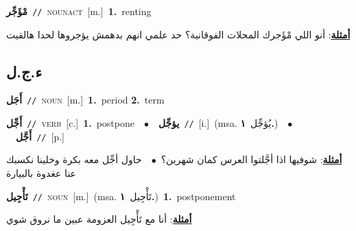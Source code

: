 \documentclass[10pt,a4paper,twoside]{article} %
\begin{document}
\begin{multicols}{2}
{{{{{\setlength\topsep{0pt}\textbf{\foreignlanguage{arabic}{مْؤَجِّر}}\ {\color{gray}\texttt{//}\color{black}}\ \textsc{noun\textunderscore act}\ [m.]\ \textbf{1.}~renting\  \begin{flushright}\color{gray}\foreignlanguage{arabic}{\textbf{\underline{\foreignlanguage{arabic}{أمثلة}}}: أنو اللي مْؤَجرك المحلات الفوقانية؟ حد علمي انهم بدهمش يؤجروها لحدا هالقيت}\end{flushright}\color{black}} \vspace{2mm}

\vspace{-3mm}
\subsection*{\color{blue}\foreignlanguage{arabic}{ء.ج.ل}\color{blue}{}} 

{\setlength\topsep{0pt}\textbf{\foreignlanguage{arabic}{أَجَل}}\ {\color{gray}\texttt{//}\color{black}}\ \textsc{noun}\ [m.]\ \textbf{1.}~period  \textbf{2.}~term\ 

{\setlength\topsep{0pt}\textbf{\foreignlanguage{arabic}{أَجِّل}}\ {\color{gray}\texttt{//}\color{black}}\ \textsc{verb}\ [c.]\ \textbf{1.}~postpone\ \ $\bullet$\ \ \setlength\topsep{0pt}\textbf{\foreignlanguage{arabic}{يؤجِّل}}\ {\color{gray}\texttt{//}\color{black}}\ [i.]\ \color{gray}(msa. \foreignlanguage{arabic}{يُؤجِّل}~\foreignlanguage{arabic}{\textbf{١.}})\color{black}\ \ $\bullet$\ \ \setlength\topsep{0pt}\textbf{\foreignlanguage{arabic}{أَجَّل}}\ {\color{gray}\texttt{//}\color{black}}\ [p.]\  \begin{flushright}\color{gray}\foreignlanguage{arabic}{\textbf{\underline{\foreignlanguage{arabic}{أمثلة}}}: شوفيها اذا أجَّلتوا العرس كمان شهرين؟\ $\bullet$\ \  حاول أجِّل معه بكرة وخلينا نكسبك عنا عغدوة بالبيارة}\end{flushright}\color{black}} \vspace{2mm}

{\setlength\topsep{0pt}\textbf{\foreignlanguage{arabic}{تَأْجِيل}}\ {\color{gray}\texttt{//}\color{black}}\ \textsc{noun}\ [m.]\ \color{gray}(msa. \foreignlanguage{arabic}{تَأْجِيل}~\foreignlanguage{arabic}{\textbf{١.}})\color{black}\ \textbf{1.}~postponement\  \begin{flushright}\color{gray}\foreignlanguage{arabic}{\textbf{\underline{\foreignlanguage{arabic}{أمثلة}}}: أنا مع تَأْجِيل العزومة عبين ما نروق شوي}\end{flushright}\color{black}} \vspace{2mm}

}}}}}
\end{multicols}
\end{document}
